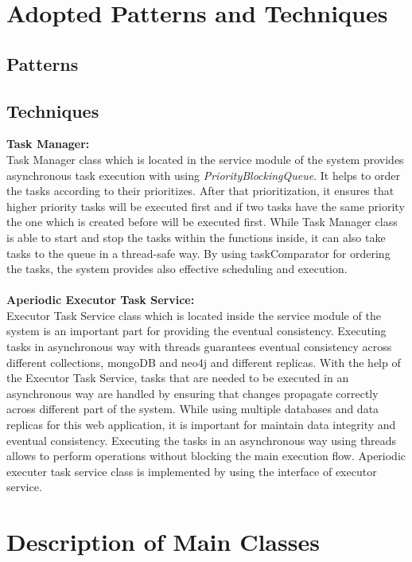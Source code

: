 \section{Adopted Patterns and Techniques}
\subsection*{Patterns}


\subsection*{Techniques}

\textbf{Task Manager:}\\
Task Manager class which is located in the service module of the system provides asynchronous task execution with using 
\textit{PriorityBlockingQueue}. It helps to order the tasks according to their prioritizes. 
After that prioritization, it ensures that higher priority tasks will be executed first and if two tasks have the 
same priority the one which is created before will be executed first. While Task Manager class is able to start and stop the tasks within the functions inside,
it can also take tasks to the queue in a thread-safe way. By using taskComparator for ordering the tasks,
the system provides also effective scheduling and execution. \\ \\
\textbf{Aperiodic Executor Task Service:}\\
Executor Task Service class which is located inside the service module of the system is an important part for providing the eventual consistency. Executing tasks in asynchronous way with threads guarantees
eventual consistency across different collections, mongoDB and neo4j and different replicas. 
With the help of the Executor Task Service, tasks that are needed to be executed in an asynchronous way are handled by ensuring that changes propagate correctly across different part of the system.
While using multiple databases and data replicas for this web application, it is important for maintain data integrity and eventual consistency.
Executing the tasks in an asynchronous way using threads allows to perform operations without blocking the main execution flow.
Aperiodic executer task service class is implemented by using the interface of executor service. 


\section{Description of Main Classes}


